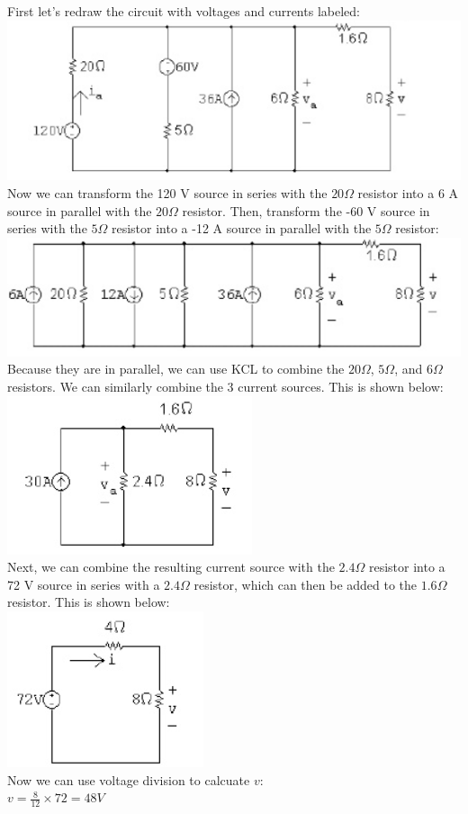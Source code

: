 First let's redraw the circuit with voltages and currents labeled:\\
\includegraphics[scale=0.5]{img/c4/a31}\\

Now we can transform the 120 V source in series with the $20\Omega$ resistor into a 6 A source
in parallel with the $20 \Omega$ resistor. Then, transform the -60 V source in series with the
$5 \Omega$ resistor into a -12 A source in parallel with the $5 \Omega$ resistor: \\
\includegraphics[scale=0.5]{img/c4/a32}\\
Because they are in parallel, we can use KCL to combine the $20\Omega$, $5\Omega$, and 
$6\Omega$ resistors. We can similarly combine the 3 current sources. This is shown below:
\includegraphics[scale=0.5]{img/c4/a33}\\
Next, we can combine the resulting current source with the $2.4\Omega$ resistor into a 72 V source
in series with a $2.4\Omega$ resistor, which can then be added to the $1.6\Omega$ resistor. This
is shown below:\\
\includegraphics[scale=0.5]{img/c4/a34}\\
Now we can use voltage division to calcuate $v$:\\
$v = \frac{8}{12} \times 72 = 48 V$

